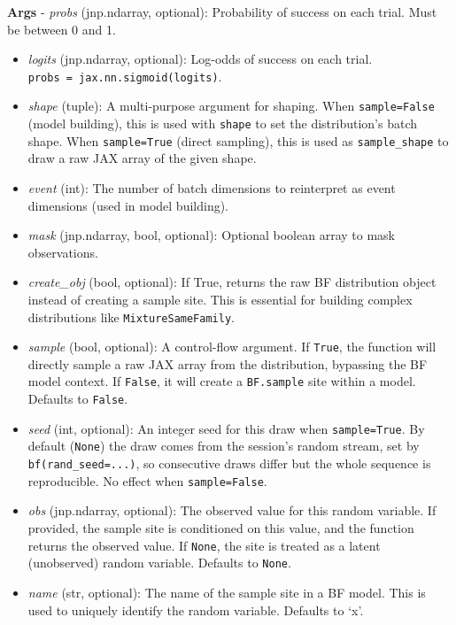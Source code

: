 \documentclass[
  letterpaper,
  DIV=11,
  numbers=noendperiod]{scrartcl}
\begin{document}
\textbf{Args} - \emph{probs} (jnp.ndarray, optional): Probability of
success on each trial. Must be between 0 and 1.

\begin{itemize}
\item
  \emph{logits} (jnp.ndarray, optional): Log-odds of success on each
  trial. \texttt{probs\ =\ jax.nn.sigmoid(logits)}.
\item
  \emph{shape} (tuple): A multi-purpose argument for shaping. When
  \texttt{sample=False} (model building), this is used with
  \texttt{shape} to set the distribution's batch shape. When
  \texttt{sample=True} (direct sampling), this is used as
  \texttt{sample\_shape} to draw a raw JAX array of the given shape.
\item
  \emph{event} (int): The number of batch dimensions to reinterpret as
  event dimensions (used in model building).
\item
  \emph{mask} (jnp.ndarray, bool, optional): Optional boolean array to
  mask observations.
\item
  \emph{create\_obj} (bool, optional): If True, returns the raw BF
  distribution object instead of creating a sample site. This is
  essential for building complex distributions like
  \texttt{MixtureSameFamily}.
\item
  \emph{sample} (bool, optional): A control-flow argument. If
  \texttt{True}, the function will directly sample a raw JAX array from
  the distribution, bypassing the BF model context. If \texttt{False},
  it will create a \texttt{BF.sample} site within a model. Defaults to
  \texttt{False}.
\item
  \emph{seed} (int, optional): An integer seed for this draw when
  \texttt{sample=True}. By default (\texttt{None}) the draw comes from
  the session's random stream, set by \texttt{bf(rand\_seed=...)}, so
  consecutive draws differ but the whole sequence is reproducible. No
  effect when \texttt{sample=False}.
\item
  \emph{obs} (jnp.ndarray, optional): The observed value for this random
  variable. If provided, the sample site is conditioned on this value,
  and the function returns the observed value. If \texttt{None}, the
  site is treated as a latent (unobserved) random variable. Defaults to
  \texttt{None}.
\item
  \emph{name} (str, optional): The name of the sample site in a BF
  model. This is used to uniquely identify the random variable. Defaults
  to `x'.
\end{itemize}
\end{document}
